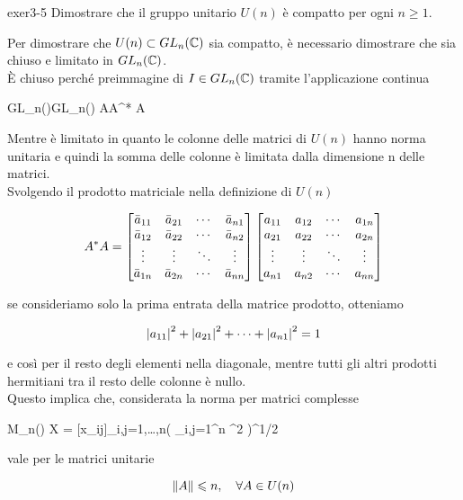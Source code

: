 {exer3-5}
{
Dimostrare che il gruppo unitario $ U(n) $ è compatto per ogni $ n \geqslant 1 $.
}
{
Per dimostrare che $ U(n) \subset GL_{n}(\mathbb{C}) $ sia compatto, è necessario dimostrare che sia chiuso e limitato in $ GL_{n}(\mathbb{C}) $. \\
È chiuso perché preimmagine di $ I \in GL_{n}(\mathbb{C}) $ tramite l'applicazione continua

	{GL_{n}(\C)}{GL_{n}(\C)}
	{A}{A^{*} A}

Mentre è limitato in quanto le colonne delle matrici di $ U(n) $ hanno norma unitaria e quindi la somma delle colonne è limitata dalla dimensione n delle matrici. \\
Svolgendo il prodotto matriciale nella definizione di $ U(n) $

\begin{equation}
	A^{*} A = %
	\bmqty{ %
			\bar{a}_{11} & \bar{a}_{21} & \cdots & \bar{a}_{n1} \\ %
			\bar{a}_{12} & \bar{a}_{22} & \cdots & \bar{a}_{n2} \\ %
			\vdots & \vdots & \ddots & \vdots \\ %
			\bar{a}_{1n} & \bar{a}_{2n} & \cdots & \bar{a}_{nn}
			}
	\bmqty{ %
			a_{11} & a_{12} & \cdots & a_{1n} \\ %
			a_{21} & a_{22} & \cdots& a_{2n} \\ %
			\vdots & \vdots & \ddots & \vdots \\ %
			a_{n1} & a_{n2} & \cdots & a_{nn}
			}
\end{equation}

se consideriamo solo la prima entrata della matrice prodotto, otteniamo

\begin{equation}
	\abs{a_{11}}^{2} + \abs{a_{21}}^{2} + \cdots + \abs{a_{n1}}^{2} = 1
\end{equation}

e così per il resto degli elementi nella diagonale, mentre tutti gli altri prodotti hermitiani tra il resto delle colonne è nullo. \\
Questo implica che, considerata la norma per matrici complesse

\map{\norm{}}
	{M_{n}(\C)}{\R}
	{X = [x_{ij}]_{i,j=1,\dots,n}}{\left( \sum_{i,j=1}^{n} ^{2} \right)^{1/2}}

vale per le matrici unitarie

\begin{equation}
	\norm{A} \leqslant n \qcomma \forall A \in U(n)
\end{equation}
}

